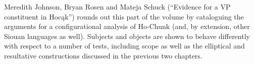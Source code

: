 \begin{refsection}
Meredith Johnson, Bryan Rosen and Mateja Schuck (``Evidence for a VP constituent in Hoc\k{a}k'') rounds out this part of the volume by cataloguing the arguments for a configurational analysis of Ho-Chunk (and, by extension, other Siouan languages as well). Subjects and objects are shown to behave differently with respect to a number of tests, including scope as well as the elliptical and resultative constructions discussed in the previous two chapters.

 
\end{refsection}

